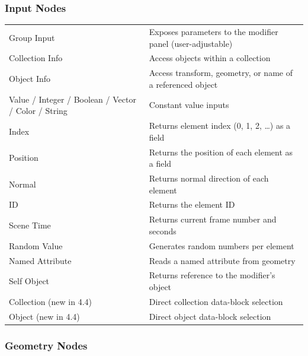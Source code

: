 \subsubsection{Input Nodes}

\begin{center}
\begin{tabularx}{\textwidth}{L{4cm}X}
\toprule
{}
 &  \\
\midrule
Group Input & Exposes parameters to the modifier panel (user-adjustable) \\
Collection Info & Access objects within a collection \\
Object Info & Access transform, geometry, or name of a referenced object \\
Value / Integer / Boolean / Vector / Color / String & Constant value inputs \\
Index & Returns element index (0, 1, 2, \ldots) as a field \\
Position & Returns the position of each element as a field \\
Normal & Returns normal direction of each element \\
ID & Returns the element ID \\
Scene Time & Returns current frame number and seconds \\
Random Value & Generates random numbers per element \\
Named Attribute & Reads a named attribute from geometry \\
Self Object & Returns reference to the modifier's object \\
Collection (new in 4.4) & Direct collection data-block selection \\
Object (new in 4.4) & Direct object data-block selection \\
\bottomrule
\end{tabularx}
\end{center}

\subsubsection{Geometry Nodes}


